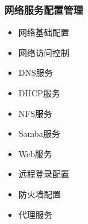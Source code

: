 \documentclass[xcolor=svgnames,presentation]{beamer}
\begin{document}
\begin{frame}
\frametitle{网络服务配置管理}
\label{sec-1-2-4}
\begin{itemize}

\item 网络基础配置
\label{sec-1-2-4-1}%

\item 网络访问控制
\label{sec-1-2-4-2}%

\item DNS服务
\label{sec-1-2-4-3}%

\item DHCP服务
\label{sec-1-2-4-4}%

\item NFS服务
\label{sec-1-2-4-5}%

\item Samba服务
\label{sec-1-2-4-6}%

\item Web服务
\label{sec-1-2-4-7}%

\item 远程登录配置
\label{sec-1-2-4-8}%

\item 防火墙配置
\label{sec-1-2-4-9}%

\item 代理服务
\label{sec-1-2-4-10}%
\end{itemize} %
\end{frame}
\end{document}
